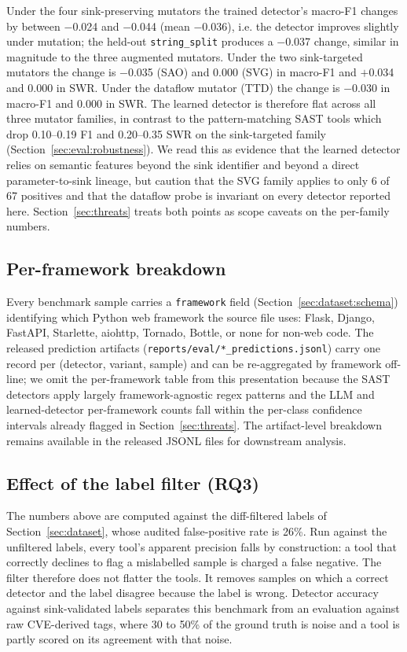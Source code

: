 Under the four sink-preserving mutators the trained detector's
macro-F1 changes by between $-$0.024 and $-$0.044 (mean $-$0.036),
i.e. the detector improves slightly under mutation; the held-out
\texttt{string\_split} produces a $-$0.037 change, similar in
magnitude to the three augmented mutators. Under the two sink-targeted
mutators the change is $-$0.035 (SAO) and $0.000$ (SVG) in macro-F1
and $+$0.034 and $0.000$ in SWR. Under the dataflow mutator (TTD)
the change is $-$0.030 in macro-F1 and $0.000$ in SWR. The learned
detector is therefore flat across all three mutator families, in
contrast to the pattern-matching SAST tools which drop
0.10--0.19 F1 and 0.20--0.35 SWR on the sink-targeted family
(Section~\ref{sec:eval:robustness}). We read this as evidence that
the learned detector relies on semantic features beyond the sink
identifier and beyond a direct parameter-to-sink lineage, but
caution that the SVG family applies to only 6 of 67 positives and
that the dataflow probe is invariant on every detector reported
here. Section~\ref{sec:threats} treats both points as scope
caveats on the per-family numbers.

\subsection{Per-framework breakdown}
\label{sec:eval:framework}

Every benchmark sample carries a \texttt{framework} field
(Section~\ref{sec:dataset:schema}) identifying which Python web
framework the source file uses: Flask, Django, FastAPI, Starlette,
aiohttp, Tornado, Bottle, or none for non-web code. The released
prediction artifacts (\texttt{reports/eval/*\_predictions.jsonl})
carry one record per (detector, variant, sample) and can be
re-aggregated by framework off-line; we omit the per-framework table
from this presentation because the SAST detectors apply largely
framework-agnostic regex patterns and the LLM and learned-detector
per-framework counts fall within the per-class confidence intervals
already flagged in Section~\ref{sec:threats}. The artifact-level
breakdown remains available in the released JSONL files for
downstream analysis.

\subsection{Effect of the label filter (RQ3)}
\label{sec:eval:labels}

The numbers above are computed against the diff-filtered labels of
Section~\ref{sec:dataset}, whose audited false-positive rate is 26\%.
Run against the unfiltered labels, every tool's apparent precision
falls by construction: a tool that correctly declines to flag a
mislabelled sample is charged a false negative. The filter therefore
does not flatter the tools. It removes samples on which a correct
detector and the label disagree because the label is wrong. Detector
accuracy against sink-validated labels separates this benchmark from
an evaluation against raw CVE-derived tags, where 30 to 50\% of the
ground truth is noise and a tool is partly scored on its agreement
with that noise.
